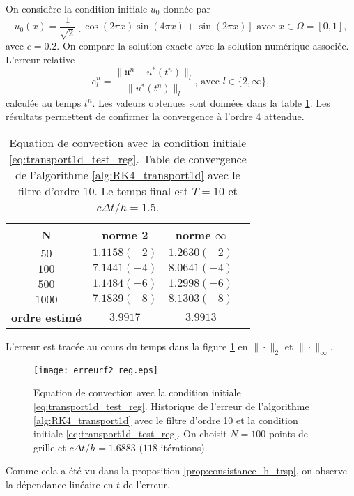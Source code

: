 On considère la condition initiale $u_0$ donnée par 
\begin{equation}
u_0(x) = \dfrac{1}{\sqrt{2}} \left[ \cos (2 \pi x) \sin (4 \pi x) + \sin ( 2 \pi x ) \right] \text{ avec } x \in \Omega = [0,1],
\label{eq:transport1d_test_reg}
\end{equation}
avec $c=0.2$. On compare la solution exacte avec la solution numérique associée. L'erreur relative
\begin{equation}
e_l^n = \dfrac{\| \mathfrak{u}^n - u^*(t^n) \|_l}{\| u^*(t^n) \|_l} \text{, avec } l \in \lbrace 2, \infty \rbrace,
\end{equation}
calculée au temps $t^n$. Les valeurs obtenues sont données dans la table \ref{tab:rate_transport1d_test_reg}. Les résultats permettent de confirmer la convergence à l'ordre 4 attendue.
\begin{table}[htbp]
\begin{center}
\begin{tabular}{|c||c|c|c|}
\hline
\textbf{N}  & \textbf{norme 2} & \textbf{norme $\infty$} \\
\hline
\hline
$50$   & $1.1158(-2)$  & $1.2630(-2)$  \\
$100$  & $7.1441(-4)$  & $8.0641(-4)$  \\
$500$  & $1.1484(-6)$  & $1.2998(-6)$  \\
$1000$ & $7.1839(-8)$  & $8.1303(-8)$  \\
\hline 
\hline
\textbf{ordre estimé}& $3.9917$ & $3.9913$\\
\hline
\end{tabular}
\end{center}
\caption{Equation de convection avec la condition initiale \eqref{eq:transport1d_test_reg}. Table de convergence de l'algorithme \ref{alg:RK4_transport1d} avec le filtre d'ordre 10. Le temps final est $T=10$ et $c \Delta t/h=1.5$.}
\label{tab:rate_transport1d_test_reg}
\end{table} 
L'erreur est tracée au cours du temps dans la figure \ref{fig:transport1d_test_reg} en $\| \cdot \|_2$ et $\| \cdot \|_{\infty}$.
\begin{figure}[htbp]
\begin{center}
\texttt{[image: erreurf2\_reg.eps]}
\end{center}
\caption{Equation de convection avec la condition initiale \eqref{eq:transport1d_test_reg}. Historique de l'erreur de l'algorithme \ref{alg:RK4_transport1d} avec le filtre d'ordre 10 et la condition initiale \eqref{eq:transport1d_test_reg}. On choisit $N=100$ points de grille et $c \Delta t/h = 1.6883$ ($118$ itérations).}
\label{fig:transport1d_test_reg}
\end{figure}
Comme cela a été vu dans la proposition \ref{prop:consistance_h_trsp}, on observe la dépendance linéaire en $t$ de l'erreur.








